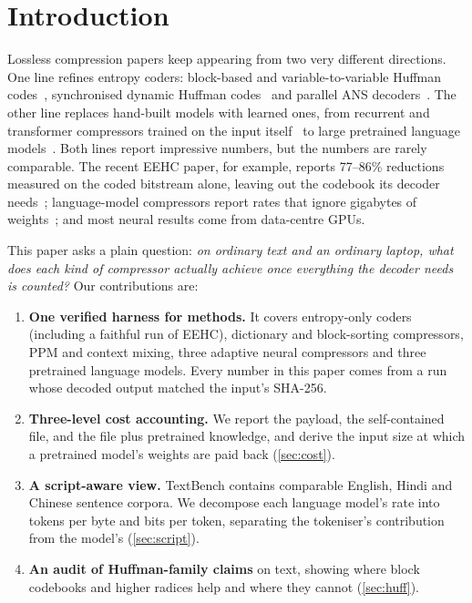 \documentclass[conference]{IEEEtran}
\begin{document}
\section{Introduction}
Lossless compression papers keep appearing from two very different directions. One line refines entropy coders: block-based and variable-to-variable Huffman codes~\cite{yeful2026eehc,tu2022v2v}, synchronised dynamic Huffman codes~\cite{klein2024dynhuff} and parallel ANS decoders~\cite{lin2023recoil}. The other line replaces hand-built models with learned ones, from recurrent and transformer compressors trained on the input itself~\cite{goyal2019deepzip,goyal2021dzip,mao2022trace,bellard2021nncpv2} to large pretrained language models~\cite{valmeekam2023llmzip,deletang2024lmic,li2025lmcompress}. Both lines report impressive numbers, but the numbers are rarely comparable. The recent EEHC paper, for example, reports 77--86\% reductions measured on the coded bitstream alone, leaving out the codebook its decoder needs~\cite{yeful2026eehc}; language-model compressors report rates that ignore gigabytes of weights~\cite{deletang2024lmic}; and most neural results come from data-centre GPUs.

This paper asks a plain question: \emph{on ordinary text and an ordinary laptop, what does each kind of compressor actually achieve once everything the decoder needs is counted?} Our contributions are:
\begin{enumerate}
\item \textbf{One verified harness for \NumMethods{} methods.} It covers entropy-only coders (including a faithful run of EEHC), dictionary and block-sorting compressors, PPM and context mixing, three adaptive neural compressors and three pretrained language models. Every number in this paper comes from a run whose decoded output matched the input's SHA-256.
\item \textbf{Three-level cost accounting.} We report the payload, the self-contained file, and the file plus pretrained knowledge, and derive the input size at which a pretrained model's weights are paid back (\cref{sec:cost}).
\item \textbf{A script-aware view.} TextBench contains comparable English, Hindi and Chinese sentence corpora. We decompose each language model's rate into tokens per byte and bits per token, separating the tokeniser's contribution from the model's (\cref{sec:script}).
\item \textbf{An audit of Huffman-family claims} on text, showing where block codebooks and higher radices help and where they cannot (\cref{sec:huff}).
\end{enumerate}
\end{document}
